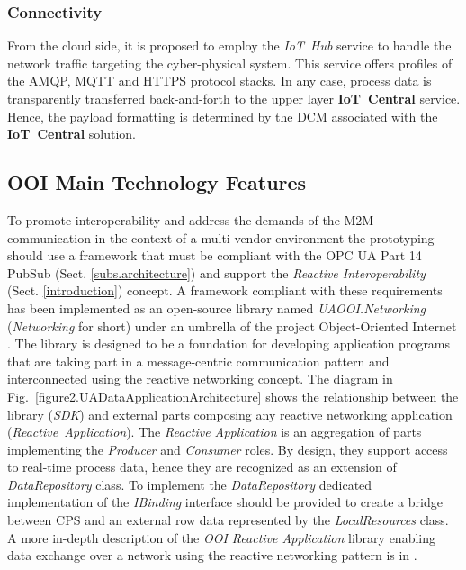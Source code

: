\documentclass{article}
\begin{document}
\subsubsection{Connectivity}\label{connectivity}

From the cloud side, it is proposed to employ the \textit{IoT\ Hub}
service to handle the network traffic targeting the cyber-physical
system. This service offers profiles of the AMQP, MQTT and HTTPS protocol
stacks. In any case, process data is transparently
transferred back-and-forth to the upper layer \textbf{IoT\ Central}
service. Hence, the payload formatting is determined by the DCM
associated with the \textbf{IoT\ Central} solution.

\subsection{OOI Main Technology Features}\label{ooi-main-technology-features}

To promote interoperability and address the demands of the M2M communication in the context of a multi-vendor environment the prototyping should use a framework that must be compliant with the OPC UA Part 14 PubSub (Sect. \ref*{subs.architecture}) and support the \emph{Reactive Interoperability} (Sect. \ref*{introduction}) concept. A framework compliant with these requirements has been implemented as an open-source library named \textit{UAOOI.Networking} (\textit{Networking} for short) under an umbrella of the project Object-Oriented Internet \cite{RefWorks:doc:5c66740ae4b081adf5804596}. The library is designed to be a foundation for developing application programs that are taking part in a message-centric communication pattern and interconnected using the reactive networking concept. The diagram in Fig.~\ref*{figure2.UADataApplicationArchitecture} shows the relationship between the library (\textit{SDK}) and external parts composing any reactive networking application (\textit{Reactive\ Application}). The \textit{Reactive Application} is an aggregation of parts implementing the \textit{Producer} and \textit{Consumer} roles. By design, they support access to real-time process data, hence they are recognized as an extension of \textit{DataRepository} class. To implement the \textit{DataRepository} dedicated implementation of the \textit{IBinding} interface should be provided to create a bridge between CPS and an external row data represented by the \textit{LocalResources} class. A more in-depth description of the \textit{OOI Reactive Application} library enabling data exchange over a network using the reactive networking pattern is in \cite{mpostol2020}.
\end{document}
